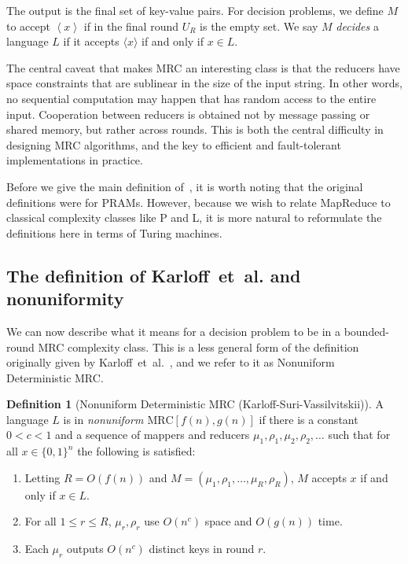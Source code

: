 \documentclass[11pt]{article}
\theoremstyle{definition}
\newtheorem{defn}{Definition}
\theoremstyle{remark}
\begin{document}
The output is the final set of key-value pairs. For decision problems, we
define $M$ to accept $\left \langle x \right \rangle$ if in the final round
$U_R$ is the empty set. We say $M$ \emph{decides} a language $L$ if it accepts
$\langle x \rangle$ if and only if $x \in L$.

The central caveat that makes MRC an interesting class is that the reducers
have space constraints that are sublinear in the size of the input string. In
other words, no sequential computation may happen that has random access to the
entire input. Cooperation between reducers is obtained not by message passing
or shared memory, but rather across rounds. This is both the central difficulty
in designing MRC algorithms, and the key to efficient and fault-tolerant
implementations in practice.

Before we give the main definition of~\cite{Karloff10}, it is worth noting
that the original definitions were for PRAMs. However, because we wish to
relate MapReduce to classical complexity classes like P and L, it is more
natural to reformulate the definitions here in terms of Turing machines.

\subsection{The definition of Karloff~et~al. and nonuniformity} \label{sec:nonuniform}

We can now describe what it means for a decision problem to be in a
bounded-round MRC complexity class. This is a less general form of the
definition originally given by Karloff~et~al.~\cite{Karloff10}, and we refer to
it as Nonuniform Deterministic MRC.

\begin{defn}[Nonuniform Deterministic MRC (Karloff-Suri-Vassilvitskii)]
A language $L$ is in \emph{nonuniform $\text{MRC}[f(n),g(n)]$} if there is a
constant $0 < c < 1$ and a sequence of mappers and reducers $\mu_1, \rho_1,
\mu_{2}, \rho_{2}, \ldots$ such that for all $x \in \{ 0,1 \}^n$ the following
is satisfied:

\begin{enumerate}
   \item Letting $R=O(f(n))$ and $M = (\mu_1, \rho_1, \dots, \mu_{R},
\rho_{R})$, $M$ accepts $x$ if and only if $x \in L$.
   \item For all $1 \leq r \leq R$, $\mu_r, \rho_r$ use $O(n^c)$ space and
$O(g(n))$ time.  
   \item Each $\mu_r$ outputs $O(n^c)$ distinct keys in round
$r$.
\end{enumerate}
\end{defn}
\end{document}
